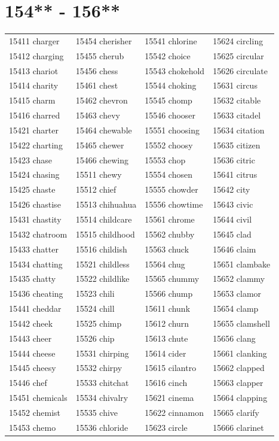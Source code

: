 \documentclass[10pt, oneside]{book}
\begin{document}
\begin{table}
	\centering
	\section*{154** - 156**}
	\begin{tabular}{l l l l}
15411 charger &15454 cherisher &15541 chlorine &15624 circling\\
15412 charging &15455 cherub &15542 choice &15625 circular\\
15413 chariot &15456 chess &15543 chokehold &15626 circulate\\
15414 charity &15461 chest &15544 choking &15631 circus\\
15415 charm &15462 chevron &15545 chomp &15632 citable\\
15416 charred &15463 chevy &15546 chooser &15633 citadel\\
15421 charter &15464 chewable &15551 choosing &15634 citation\\
15422 charting &15465 chewer &15552 choosy &15635 citizen\\
15423 chase &15466 chewing &15553 chop &15636 citric\\
15424 chasing &15511 chewy &15554 chosen &15641 citrus\\
15425 chaste &15512 chief &15555 chowder &15642 city\\
15426 chastise &15513 chihuahua &15556 chowtime &15643 civic\\
15431 chastity &15514 childcare &15561 chrome &15644 civil\\
15432 chatroom &15515 childhood &15562 chubby &15645 clad\\
15433 chatter &15516 childish &15563 chuck &15646 claim\\
15434 chatting &15521 childless &15564 chug &15651 clambake\\
15435 chatty &15522 childlike &15565 chummy &15652 clammy\\
15436 cheating &15523 chili &15566 chump &15653 clamor\\
15441 cheddar &15524 chill &15611 chunk &15654 clamp\\
15442 cheek &15525 chimp &15612 churn &15655 clamshell\\
15443 cheer &15526 chip &15613 chute &15656 clang\\
15444 cheese &15531 chirping &15614 cider &15661 clanking\\
15445 cheesy &15532 chirpy &15615 cilantro &15662 clapped\\
15446 chef &15533 chitchat &15616 cinch &15663 clapper\\
15451 chemicals &15534 chivalry &15621 cinema &15664 clapping\\
15452 chemist &15535 chive &15622 cinnamon &15665 clarify\\
15453 chemo &15536 chloride &15623 circle &15666 clarinet\\
	\end{tabular}
 \end{table}
\clearpage
\end{document}
